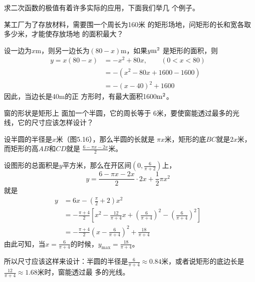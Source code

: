 求二次函数的极值有着许多实际的应用，下面我们举几
个例子。

\begin{example}
    某工厂为了存放材料，需要围一个周长为160米
的矩形场地，问矩形的长和宽各取多少米，才能使存放场地
的面积最大？
\end{example}

\begin{solution}
    设一边为$x$m，则另一边长为$(80-x)$m，如果$y{\rm m}^2$
是矩形的面积，则
\[\begin{split}
    y=x(80-x)&=-x^2+80x,\qquad (0<x<80)\\
    &=-(x^2-80x+1600-1600)\\
    &=-(x-40)^2+1600
\end{split}\]
因此，当边长是40m的正
方形时，有最大面积1600${\rm m}^2$。
\end{solution}

\begin{example}
    窗的形状是矩形上
面加一个半圆，它的周长等于
6米，要使窗能透过最多的光
线，它的尺寸应该怎样设计？
\end{example}

\begin{solution}
设半圆的半径是$x$米（图5.16），那么半圆的长就是
$\pi x$米，矩形的底$BC$就是$2x$米，而矩形的高$AB$和$CD$就是
$\frac{6-\pi x-2x}{2}$米。

\begin{figure}[htp]
    \centering
{}
    \caption{}
\end{figure}

设图形的总面积是$y$平方米，那么在开区间$\left(0,\frac{6}{\pi+2}\right)$上，
\[y=\frac{6-\pi x-2x}{2}\cdot 2x+\frac{1}{2}\pi x^2\]
就是
\[\begin{split}
    y&=6x-\left(\frac{\pi}{2}+2\right)x^2\\
    &=-\frac{\pi+4}{2}\left[x^2-\frac{12}{\pi+4}x+\left(\frac{6}{\pi+4}\right)^2-\left(\frac{6}{\pi+4}\right)^2\right]\\
    &=-\frac{\pi+4}{2}\left(x-\frac{6}{\pi+4}\right)^2+\frac{18}{\pi+4}
\end{split}\]
由此可知，当$x=\frac{6}{\pi+4}$的时候，$y_{\max}=\frac{18}{\pi+4}$。

所以尺寸应该这样来设计：半圆的半径是$\frac{6}{\pi+4}\approx 0.84$米，或者说矩形的底边长是$\frac{12}{\pi+4}\approx 1.68$米时，窗能透过最
多的光线。
\end{solution}

